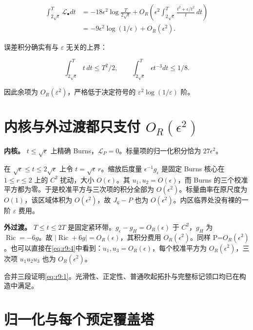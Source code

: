 \documentclass[UTF8,11pt,fontset=none]{ctexart}
\begin{document}
\[
\begin{aligned}
\int_{2\sqrt\epsilon}^{T}\mathscr L_\bullet dt
&=-18\epsilon^2\log\frac{T}{2\sqrt\epsilon}
 +O_R\left(\epsilon^2\int_{2\sqrt\epsilon}^{T}
 \frac{t^2+\epsilon/t^2}{t}\,dt\right)\\
&=-9\epsilon^2\log(1/\epsilon)+O_R(\epsilon^2).
\end{aligned}
\]

误差积分确实有与 \(\varepsilon\) 无关的上界：

\[
\int_{2\sqrt\epsilon}^{T}t\,dt\le T^2/2,\qquad
\int_{2\sqrt\epsilon}^{T}\epsilon t^{-3}dt\le1/8.
\]

因此余项为 \(O_R(\varepsilon^2)\)，严格低于决定符号的 \(\varepsilon^2\log(1/\varepsilon)\) 阶。

\section{\texorpdfstring{内核与外过渡都只支付 \(O_R(\epsilon^2)\)}{内核与外过渡都只支付 O\_R(\textbackslash epsilon\^{}2)}}\label{ch9:ux5185ux6838ux4e0eux5916ux8fc7ux6e21ux90fdux53eaux652fux4ed8-o_repsilon2}

\textbf{内核。} \(t\le\sqrt\epsilon\) 上精确 Burns，\(\mathscr L_P=0\)。标量项的归一化积分恰为 \(27\epsilon^2\)。

在 \(\sqrt\epsilon\le t\le2\sqrt\epsilon\) 上令 \(t=\sqrt\epsilon\,r\)。缩放后度量 \(\epsilon^{-1}g_\epsilon\) 是固定 Burns 核心在 \(1\le r\le2\) 上的 \(C^2\) 扰动，大小 \(O(\epsilon)\)。其 \(u_1,u_2=O(\epsilon)\)，而 Burns 的三个校准平方都为零。于是校准平方与三次项的积分全部为 \(O(\epsilon^2)\)。标量曲率在原尺度为 \(O(1)\)，该区域体积为 \(O(\epsilon^2)\)，故 \(J_6-P\) 也为 \(O(\epsilon^2)\)。内区临界处没有裸的一阶 \(\varepsilon\) 费用。

\textbf{外过渡。} \(T\le t\le2T\) 是固定紧环带。\(g_\epsilon-g_H=O_R(\epsilon)\) 于 \(C^2\)，\(g_H\) 为 \(\operatorname{Ric}=-6g\)。故 \(|\operatorname{Ric}+6g|=O_R(\epsilon)\)，其积分费用 \(O_R(\epsilon^2)\)。同样 P=\(O_R(\epsilon^2)\)。也可以直接在\eqref{eq:r9:4}中看到：\(u_1,u_3=O_R(\epsilon)\)，每个校准平方为 \(O_R(\epsilon^2)\)，三次项 \(u_1u_2u_3\) 也为 \(O_R(\epsilon^2)\)。

合并三段证明\eqref{eq:r9:1}。光滑性、正定性、普通吹起拓扑与完整标记领口均已在构造中满足。

\section{归一化与每个预定覆盖塔}\label{ch9:ux5f52ux4e00ux5316ux4e0eux6bcfux4e2aux9884ux5b9aux8986ux76d6ux5854}
\end{document}
